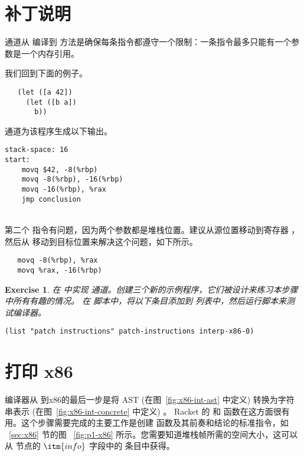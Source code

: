 \documentclass[11pt]{book}
\newtheorem{exercise}[theorem]{Exercise}
\begin{document}
\section{补丁说明}
\label{sec:patch-s0}

  通道从 \LangXVar{} 编译到
\LangXInt{} 方法是确保每条指令都遵守一个限制：一条指令最多只能有一个参数是一个内存引用。

我们回到下面的例子。
\begin{lstlisting}
   (let ([a 42])
     (let ([b a])
       b))
\end{lstlisting}
  通道为该程序生成以下输出。\\
\begin{minipage}{0.5\textwidth}
\begin{lstlisting}
stack-space: 16
start:
    movq $42, -8(%rbp)
    movq -8(%rbp), -16(%rbp)
    movq -16(%rbp), %rax
    jmp conclusion
\end{lstlisting}
\end{minipage}\\
第二个  指令有问题，因为两个参数都是堆栈位置。建议从源位置移动到寄存器  ，然后从  移动到目标位置来解决这个问题，如下所示。
\begin{lstlisting}
   movq -8(%rbp), %rax
   movq %rax, -16(%rbp)
\end{lstlisting}

\begin{exercise}
\normalfont 在  中实现
 通道。创建三个新的示例程序，它们被设计来练习本步骤中所有有趣的情况。
%
在  脚本中，将以下条目添加到  列表中，然后运行脚本来测试编译器。
\begin{lstlisting}
(list "patch instructions" patch-instructions interp-x86-0)
\end{lstlisting}
\end{exercise}


\section{打印 x86}
\label{sec:print-x86}

编译器从 \LangVar{} 到x86的最后一步是将
\LangXInt{} AST (在图~\ref{fig:x86-int-ast} 中定义) 转换为字符串表示 (在图~\ref{fig:x86-int-concrete} 中定义) 。 Racket 的  和
 函数在这方面很有用。这个步骤需要完成的主要工作是创建  函数及其前奏和结论的标准指令，如 ~\ref{sec:x86} 节的图 ~\ref{fig:p1-x86} 所示。您需要知道堆栈帧所需的空间大小，这可以从  节点的 $\itm{info}$ 字段中的  条目中获得。
\end{document}
